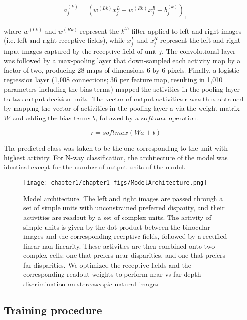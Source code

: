 \begin{equation}
  a_j^{(k)}=(w^{(Lk)} x_j^L+w^{(Rk)} x_j^R+b_j^{(k)} )_+
\end{equation}

where $w^{(Lk)}$ and $w^{(Rk)}$ represent the $k^{th}$ filter applied to left and right images (i.e. left and right receptive fields), while $x_j^L$ and $x_j^R$ represent the left and right input images captured by the receptive field of unit $j$.
The convolutional layer was followed by a max-pooling layer that down-sampled each activity map by a factor of two, producing 28 maps of dimensions 6-by-6 pixels. Finally, a logistic regression layer (1,008 connections; 36 per feature map, resulting in 1,010 parameters including the bias terms) mapped the activities in the pooling layer to two output decision units. The vector of output activities r was thus obtained by mapping the vector of activities in the pooling layer a via the weight matrix $W$ and adding the bias terms $b$, followed by a $softmax$ operation:

\begin{equation}
  r=softmax(Wa+b)
\end{equation}

The predicted class was taken to be the one corresponding to the unit with highest activity. For N-way classification, the architecture of the model was identical except for the number of output units of the model.

\begin{figure}[!h]
  \centering
  \texttt{[image: chapter1/chapter1-figs/ModelArchitecture.png]}
  \caption[Model architecture.]{Model architecture. The left and right images are passed through a set of simple units with unconstrained preferred disparity, and their activities are readout by a set of complex units. The activity of simple units is given by the dot product between the binocular images and the corresponding receptive fields, followed by a rectified linear non-linearity. These activities are then combined onto two complex cells: one that prefers near disparities, and one that prefers far disparities. We optimized the receptive fields and the corresponding readout weights to perform near vs far depth discrimination on stereoscopic natural images.}
  \label{fig:ModelArch}
\end{figure}


\subsection{Training procedure}

